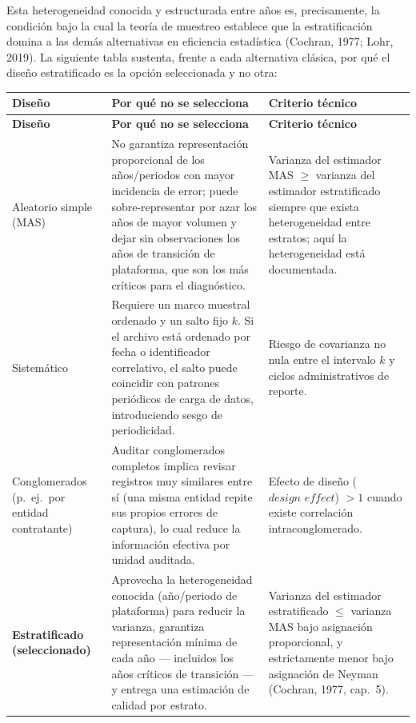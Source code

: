 \documentclass[11pt,letterpaper]{article}
\begin{document}
Esta heterogeneidad conocida y estructurada entre años es, precisamente, la
condición bajo la cual la teoría de muestreo establece que la estratificación
domina a las demás alternativas en eficiencia estadística (Cochran, 1977;
Lohr, 2019). La siguiente tabla sustenta, frente a cada alternativa clásica,
por qué el diseño estratificado es la opción seleccionada y no otra:

\begin{center}
\small
\begin{longtable}{p{2.5cm}p{5.9cm}p{4.8cm}}
\toprule
\textbf{Diseño} & \textbf{Por qué no se selecciona} & \textbf{Criterio técnico} \\
\midrule
\endfirsthead
\toprule
\textbf{Diseño} & \textbf{Por qué no se selecciona} & \textbf{Criterio técnico} \\
\midrule
\endhead
Aleatorio simple (MAS) & No garantiza representación proporcional de los años/periodos con mayor incidencia de error; puede sobre-representar por azar los años de mayor volumen y dejar sin observaciones los años de transición de plataforma, que son los más críticos para el diagnóstico. & Varianza del estimador MAS $\geq$ varianza del estimador estratificado siempre que exista heterogeneidad entre estratos; aquí la heterogeneidad está documentada. \\
Sistemático & Requiere un marco muestral ordenado y un salto fijo $k$. Si el archivo está ordenado por fecha o identificador correlativo, el salto puede coincidir con patrones periódicos de carga de datos, introduciendo sesgo de periodicidad. & Riesgo de covarianza no nula entre el intervalo $k$ y ciclos administrativos de reporte. \\
Conglomerados (p.\ ej.\ por entidad contratante) & Auditar conglomerados completos implica revisar registros muy similares entre sí (una misma entidad repite sus propios errores de captura), lo cual reduce la información efectiva por unidad auditada. & Efecto de diseño ($\textit{design effect}$) $>1$ cuando existe correlación intraconglomerado. \\
\textbf{Estratificado (seleccionado)} & Aprovecha la heterogeneidad conocida (año/periodo de plataforma) para reducir la varianza, garantiza representación mínima de cada año --- incluidos los años críticos de transición --- y entrega una estimación de calidad por estrato. & Varianza del estimador estratificado $\leq$ varianza MAS bajo asignación proporcional, y estrictamente menor bajo asignación de Neyman (Cochran, 1977, cap.\ 5). \\
\bottomrule
\end{longtable}
\end{center}
\end{document}
